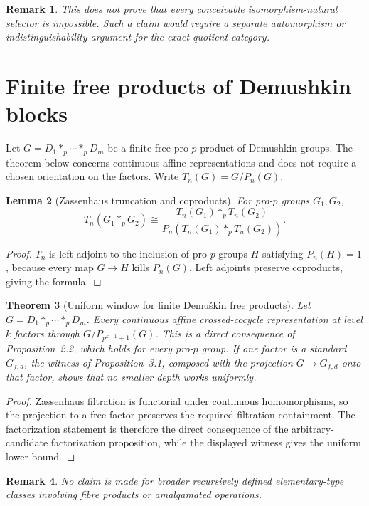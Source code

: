 \documentclass[11pt]{article}
\newtheorem{theorem}{Theorem}[section]
\newtheorem{lemma}[theorem]{Lemma}
\newtheorem{remark}[theorem]{Remark}
\begin{document}
\begin{remark}
This does not prove that every conceivable isomorphism-natural selector is impossible. Such a claim would require a separate automorphism or indistinguishability argument for the exact quotient category.
\end{remark}

\section{Finite free products of Demushkin blocks}
Let $G=D_1*_p\cdots *_pD_m$ be a finite free pro-$p$ product of Demushkin groups. The theorem below concerns continuous affine representations and does not require a chosen orientation on the factors. Write $T_n(G)=G/P_n(G)$.

\begin{lemma}[Zassenhaus truncation and coproducts]
For pro-$p$ groups $G_1,G_2$,
\[
T_n(G_1*_pG_2)
\cong
\frac{T_n(G_1)*_pT_n(G_2)}
{P_n(T_n(G_1)*_pT_n(G_2))}.
\]
\end{lemma}

\begin{proof}
$T_n$ is left adjoint to the inclusion of pro-$p$ groups $H$ satisfying $P_n(H)=1$, because every map $G\to H$ kills $P_n(G)$. Left adjoints preserve coproducts, giving the formula.
\end{proof}

\begin{theorem}[Uniform window for finite Demu\v{s}kin free products]
Let $G=D_1*_p\cdots *_pD_m$. Every continuous affine crossed-cocycle
representation at level $k$ factors through $G/P_{p^{k-1}+1}(G)$.
This is a direct consequence of Proposition~2.2, which holds for every
pro-$p$ group. If one factor is a standard $G_{f,d}$, the witness of
Proposition~3.1, composed with the projection $G\to G_{f,d}$ onto that factor,
shows that no smaller depth works uniformly.
\end{theorem}

\begin{proof}
Zassenhaus filtration is functorial under continuous homomorphisms, so the
projection to a free factor preserves the required filtration containment.
The factorization statement is therefore the direct consequence of the
arbitrary-candidate factorization proposition, while the displayed witness
gives the uniform lower bound.
\end{proof}\begin{remark}
No claim is made for broader recursively defined elementary-type classes involving fibre products or amalgamated operations.
\end{remark}
\end{document}
